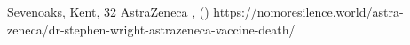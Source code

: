           {Sevenoaks, Kent, }
          {32}
          {AstraZeneca}
          {}
          {
            ,
             ()
          }
          {https://nomoresilence.world/astra-zeneca/dr-stephen-wright-astrazeneca-vaccine-death/}

